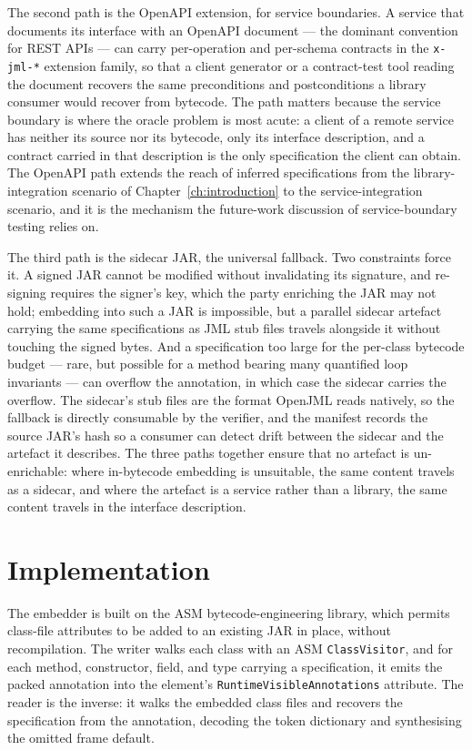 The second path is the OpenAPI extension, for service boundaries. A service that
documents its interface with an OpenAPI document --- the dominant convention for
REST APIs --- can carry per-operation and per-schema contracts in the
\texttt{x-jml-*} extension family, so that a client generator or a contract-test
tool reading the document recovers the same preconditions and postconditions a
library consumer would recover from bytecode. The path matters because the
service boundary is where the oracle problem is most acute: a client of a remote
service has neither its source nor its bytecode, only its interface description,
and a contract carried in that description is the only specification the client
can obtain. The OpenAPI path extends the reach of inferred specifications from
the library-integration scenario of Chapter~\ref{ch:introduction} to the
service-integration scenario, and it is the mechanism the future-work discussion
of service-boundary testing relies on.

The third path is the sidecar JAR, the universal fallback. Two constraints force
it. A signed JAR cannot be modified without invalidating its signature, and
re-signing requires the signer's key, which the party enriching the JAR may not
hold; embedding into such a JAR is impossible, but a parallel sidecar artefact
carrying the same specifications as JML stub files travels alongside it without
touching the signed bytes. And a specification too large for the per-class
bytecode budget --- rare, but possible for a method bearing many quantified loop
invariants --- can overflow the annotation, in which case the sidecar carries the
overflow. The sidecar's stub files are the format OpenJML reads natively, so the
fallback is directly consumable by the verifier, and the manifest records the
source JAR's hash so a consumer can detect drift between the sidecar and the
artefact it describes. The three paths together ensure that no artefact is
un-enrichable: where in-bytecode embedding is unsuitable, the same content
travels as a sidecar, and where the artefact is a service rather than a library,
the same content travels in the interface description.

\section{Implementation}
\label{sec:dist-impl}

The embedder is built on the ASM bytecode-engineering library, which permits
class-file attributes to be added to an existing JAR in place, without
recompilation. The writer walks each class with an ASM \texttt{ClassVisitor},
and for each method, constructor, field, and type carrying a specification, it
emits the packed annotation into the element's
\texttt{RuntimeVisibleAnnotations} attribute. The reader is the inverse: it
walks the embedded class files and recovers the specification from the
annotation, decoding the token dictionary and synthesising the omitted frame
default.

